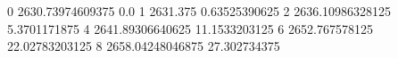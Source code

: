 0 2630.73974609375 0.0
1 2631.375 0.63525390625
2 2636.10986328125 5.3701171875
4 2641.89306640625 11.1533203125
6 2652.767578125 22.02783203125
8 2658.04248046875 27.302734375
